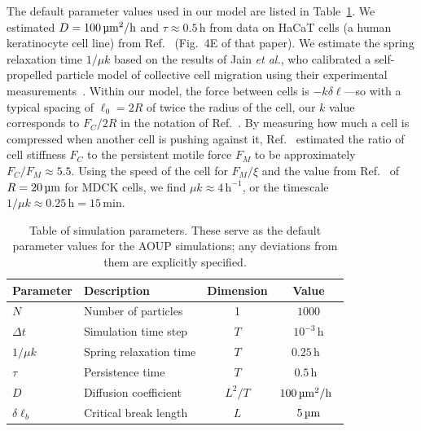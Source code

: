 The default parameter values used in our model are listed in Table~\ref{tab:ch3:param}. We estimated $D = 100\,\textrm{\textmu}\mathrm{m^2/h}$ and $\tau \approx 0.5\,\mathrm{h}$ from data on HaCaT cells (a human keratinocyte cell line) from Ref.~\cite{selmeczi2005cell} (Fig.~4E of that paper). We estimate the spring relaxation time $1/\mu k$ based on the results of Jain \textit{et al.}, who calibrated a self-propelled particle model of collective cell migration using their experimental measurements~\cite{jain2020role}. Within our model, the force between cells is $-k\delta \ell$---so with a typical spacing of $\ell_0 = 2R$ of twice the radius of the cell, our $k$ value corresponds to $F_C/2R$ in the notation of Ref.~\cite{jain2020role}. By measuring how much a cell is compressed when another cell is pushing against it, Ref.~\cite{jain2020role} estimated the ratio of cell stiffness $F_C$ to the persistent motile force $F_M$ to be approximately $F_C/F_M\approx 5.5$. Using the speed of the cell for $F_M/\xi$ and the value from Ref.~\cite{jain2020role} of $R=20\,\textrm{\textmu}\mathrm{m}$ for MDCK cells, we find $\mu k\approx 4\,\mathrm{h^{-1}}$, or the timescale ${1}/{\mu k} \approx 0.25\,\mathrm{h} = 15\,\textrm{min}$.

\begin{table}
\centering
\caption[Default parameters of the AOUP fracture simulations]{Table of simulation parameters. These serve as the default parameter values for the AOUP simulations; any deviations from them are explicitly specified.\label{tab:ch3:param}}
\begin{tabular}{llcc}
\toprule\toprule
Parameter & Description & Dimension & Value \\
\midrule
$N$ & Number of particles & 1 & $1000$\\
$\Delta t$ & Simulation time step & $T$ & $10^{-3}\,\mathrm{h}$\\
$1/\mu k$ & Spring relaxation time & $T$ & $0.25\,\mathrm{h}$~\cite{jain2020role}\\
$\tau$ & Persistence time & $T$ & $0.5\,\mathrm{h}$~\cite{selmeczi2005cell}\\
$D$ & Diffusion coefficient & $L^2/T$ & $100\,\textrm{\textmu}\mathrm{m^2/h}$~\cite{selmeczi2005cell}\\
$\delta\ell_b$ & Critical break length & $L$ & $5\,\textrm{\textmu}\mathrm{m}$\\
\bottomrule\bottomrule
\end{tabular}
\end{table}


